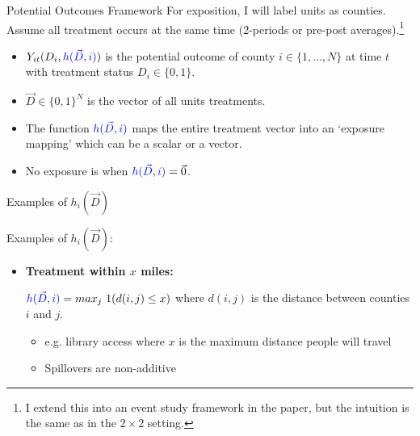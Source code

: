 \documentclass[aspectratio=169]{beamer}
\begin{document}
\begin{frame}{Potential Outcomes Framework}
    For exposition, I will label units as counties. Assume all treatment occurs at the same time (2-periods or pre-post averages).\footnote{I extend this into an event study framework in the paper, but the intuition is the same as in the $2 \times 2$ setting.}
    
    \begin{itemize}
        \item $Y_{it}(D_i, \textcolor{blue}{h(\vec{D}, i)})$ is the potential outcome of county $i \in \{ 1, \dots, N \}$ at time $t$ with treatment status $D_i \in \{0, 1\}$.
        
        \pause
        \item $\vec{D} \in \{0,1\}^N$ is the vector of all units treatments.
        
        \pause
        \item The function $\textcolor{blue}{h(\vec{D}, i)}$ maps the entire treatment vector into an `exposure mapping' which can be a scalar or a vector.
        
        \pause
        \item No exposure is when $\textcolor{blue}{h(\vec{D}, i)} = \vec{0}$.
    \end{itemize}
\end{frame}


\begin{frame}{Examples of $h_i(\vec{D})$}
    
    Examples of $h_i(\vec{D})$:
    
    \begin{itemize}
        \item \textbf{Treatment within $x$ miles:}
        
        $\textcolor{blue}{h(\vec{D}, i)} = max_j \ 1(d(i, j) \leq x)$ where $d(i,j)$ is the distance between counties $i$ and $j$. 

        \begin{itemize}
            \item e.g. library access where $x$ is the maximum distance people will travel
            
            \item Spillovers are non-additive
        \end{itemize}

    \end{itemize}
\end{frame}
\end{document}
